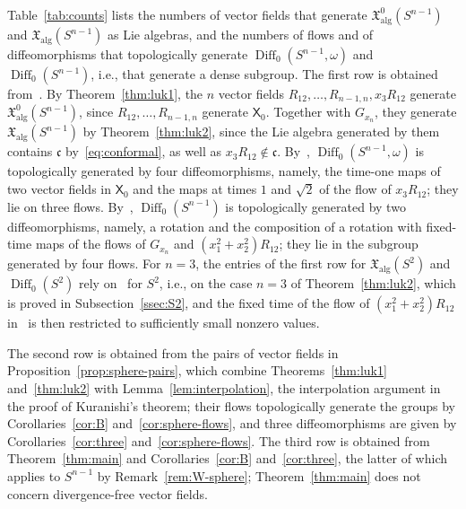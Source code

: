 \documentclass{article}
\newcommand{\frakc}{\mathfrak{c}}
\newcommand{\xalg}{\mathfrak X_{\mathrm{alg}}}
\newcommand{\xalgz}{\mathfrak X^{0}_{\mathrm{alg}}}
\newcommand{\sX}{\mathsf{X}}
\theoremstyle{definition}
\theoremstyle{plain}
\begin{document}
 Table~\ref{tab:counts} lists the numbers of vector fields that generate $\xalgz(S^{n-1})$ and $\xalg(S^{n-1})$ as Lie algebras, and the numbers of flows and of diffeomorphisms that topologically generate $\operatorname{Diff}_0(S^{n-1},\omega)$ and $\operatorname{Diff}_0(S^{n-1})$, i.e., that generate a dense subgroup.
The first row is obtained from~\cite{Luk77}.
By Theorem~\ref{thm:luk1}, the $n$ vector fields $R_{12},\ldots,R_{n-1,n},x_3R_{12}$ generate $\xalgz(S^{n-1})$, since $R_{12},\ldots,R_{n-1,n}$ generate $\sX_0$.
Together with $G_{x_n}$, they generate $\xalg(S^{n-1})$ by Theorem~\ref{thm:luk2}, since the Lie algebra generated by them contains $\frakc$ by~\eqref{eq:conformal}, as well as $x_3R_{12}\notin\frakc$.
By~\cite[Theorem~1]{Luk77}, $\operatorname{Diff}_0(S^{n-1},\omega)$ is topologically generated by four diffeomorphisms, namely, the time-one maps of two vector fields in $\sX_0$ and the maps at times $1$ and $\sqrt2$ of the flow of $x_3R_{12}$; they lie on three flows.
By~\cite[Theorem~3]{Luk77}, $\operatorname{Diff}_0(S^{n-1})$ is topologically generated by two diffeomorphisms, namely, a rotation and the composition of a rotation with fixed-time maps of the flows of $G_{x_n}$ and $(x_1^2+x_2^2)R_{12}$; they lie in the subgroup generated by four flows.
For $n=3$, the entries of the first row for $\xalg(S^2)$ and $\operatorname{Diff}_0(S^2)$ rely on~\cite[Lemma~2]{Luk77} for $S^2$, i.e., on the case $n=3$ of Theorem~\ref{thm:luk2}, which is proved in Subsection~\ref{ssec:S2}, and the fixed time of the flow of $(x_1^2+x_2^2)R_{12}$ in~\cite[Theorem~3]{Luk77} is then restricted to sufficiently small nonzero values.

The second row is obtained from the pairs of vector fields in Proposition~\ref{prop:sphere-pairs}, which combine Theorems~\ref{thm:luk1} and~\ref{thm:luk2} with Lemma~\ref{lem:interpolation}, the interpolation argument in the proof of Kuranishi's theorem; their flows topologically generate the groups by Corollaries~\ref{cor:B} and~\ref{cor:sphere-flows}, and three diffeomorphisms are given by Corollaries~\ref{cor:three} and~\ref{cor:sphere-flows}.
The third row is obtained from Theorem~\ref{thm:main} and Corollaries~\ref{cor:B} and~\ref{cor:three}, the latter of which applies to $S^{n-1}$ by Remark~\ref{rem:W-sphere}; Theorem~\ref{thm:main} does not concern divergence-free vector fields.
\end{document}
